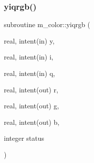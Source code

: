 \subsubsection{\texorpdfstring{yiqrgb()}{yiqrgb()}}
{\footnotesize\ttfamily subroutine m\+\_\+color\+::yiqrgb (\begin{DoxyParamCaption}\item[{real, intent(in)}]{y,  }\item[{real, intent(in)}]{i,  }\item[{real, intent(in)}]{q,  }\item[{real, intent(out)}]{r,  }\item[{real, intent(out)}]{g,  }\item[{real, intent(out)}]{b,  }\item[{integer}]{status }\end{DoxyParamCaption})\hspace{0.3cm}{\ttfamily [private]}}


